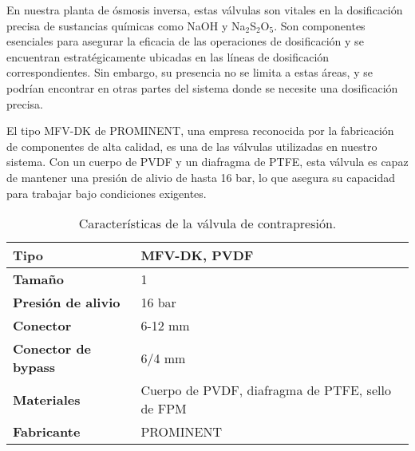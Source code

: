 En nuestra planta de ósmosis inversa, estas válvulas son vitales en la dosificación precisa de sustancias químicas como
NaOH y Na$_2$S$_2$O$_5$. Son componentes esenciales para asegurar la eficacia de las operaciones de dosificación y
se encuentran estratégicamente ubicadas en las líneas de dosificación correspondientes. Sin embargo, su presencia
no se limita a estas áreas, y se podrían encontrar en otras partes del sistema donde se necesite una dosificación
precisa.

El tipo MFV-DK de PROMINENT, una empresa reconocida por la fabricación de componentes de alta
calidad, es una de las válvulas utilizadas en nuestro sistema. Con un cuerpo de PVDF y un diafragma
de PTFE, esta válvula es capaz de mantener una presión de alivio de hasta 16 bar, lo que asegura su
capacidad para trabajar bajo condiciones exigentes.



\begin{table}[H]
    \centering
    \caption{Características de la válvula de contrapresión.}
    \label{table:valvula_retencion_presion}
    \begin{tabular}{| L{6cm} | L{6cm} |}
        \hline
        \textbf{Tipo}               & MFV-DK, PVDF                                    \\
        \hline
        \textbf{Tamaño}             & 1                                               \\
        \hline
        \textbf{Presión de alivio}  & 16 bar                                          \\
        \hline
        \textbf{Conector}           & 6-12 mm                                         \\
        \hline
        \textbf{Conector de bypass} & 6/4 mm                                          \\
        \hline
        \textbf{Materiales}         & Cuerpo de PVDF, diafragma de PTFE, sello de FPM \\
        \hline
        \textbf{Fabricante}         & PROMINENT                                       \\
        \hline
    \end{tabular}
\end{table}
